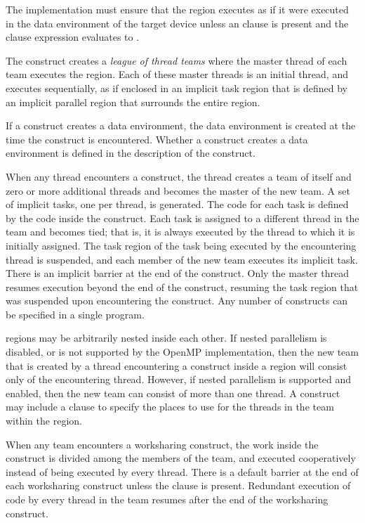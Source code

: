 The implementation must ensure that the  region executes as if it were executed in the data environment of the target device unless an  clause is present and the  clause expression evaluates to .

The  construct creates a \emph{league of thread teams} 
where the master thread of each
team executes the region. Each of these master threads is an initial thread, and executes
sequentially, as if enclosed in an implicit task region that is defined by an implicit
parallel region that surrounds the entire  region.

If a construct creates a data environment, the data environment is created at the time the
construct is encountered. Whether a construct creates a data environment is defined in 
the description of the construct.

When any thread encounters a  construct, the thread creates a team of itself
and zero or more additional threads and becomes the master of the new team. A set of 
implicit tasks, one per thread, is generated. The code for each task is defined by the code 
inside the  construct. Each task is assigned to a different thread in the team
and becomes tied; that is, it is always executed by the thread to which it is initially 
assigned. The task region of the task being executed by the encountering thread is 
suspended, and each member of the new team executes its implicit task. There is an 
implicit barrier at the end of the  construct. Only the master thread resumes
execution beyond the end of the  construct, resuming the task region that
was suspended upon encountering the  construct. Any number of
 constructs can be specified in a single program.

 regions may be arbitrarily nested inside each other. If nested parallelism is
disabled, or is not supported by the OpenMP implementation, then the new team that is 
created by a thread encountering a  construct inside a  region
will consist only of the encountering thread. However, if nested parallelism is supported 
and enabled, then the new team can consist of more than one thread. A 
construct may include a  clause to specify the places to use for the threads
in the team within the  region.

When any team encounters a worksharing construct, the work inside the construct is 
divided among the members of the team, and executed cooperatively instead of being 
executed by every thread. There is a default barrier at the end of each worksharing 
construct unless the  clause is present. Redundant execution of code by every
thread in the team resumes after the end of the worksharing construct.

